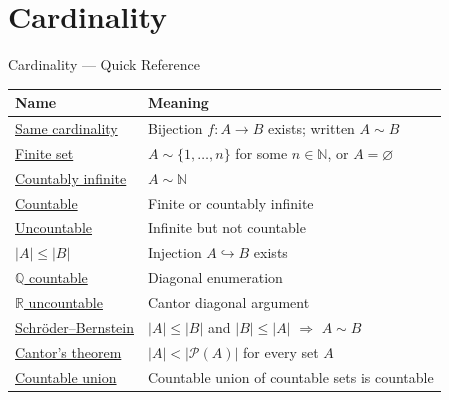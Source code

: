 \section{Cardinality}


\begin{toolkitbox}{Cardinality --- Quick Reference}
\small
\begin{tabular}{l l}
\toprule
\textbf{Name}  & \textbf{Meaning} \\
\midrule
\hyperref[def:same-cardinality]{Same cardinality}      & Bijection $f : A \to B$ exists; written $A \sim B$            \\
\hyperref[def:finite-infinite]{Finite set}            & $A \sim \{1,\dots,n\}$ for some $n \in \mathbb{N}$, or $A = \varnothing$ \\
\hyperref[def:countable]{Countably infinite}    & $A \sim \mathbb{N}$                                           \\
\hyperref[def:countable]{Countable}             & Finite or countably infinite                                  \\
\hyperref[def:countable]{Uncountable}           & Infinite but not countable                                    \\
\hyperref[def:cardinality-order]{$|A| \leq |B|$}        & Injection $A \hookrightarrow B$ exists                        \\
\hyperref[thm:Q-countable]{$\mathbb{Q}$ countable}  & Diagonal enumeration                                       \\
\hyperref[thm:R-uncountable]{$\mathbb{R}$ uncountable}  & Cantor diagonal argument                                \\
\hyperref[thm:schroder-bernstein]{Schr\"{o}der--Bernstein}   & $|A|\leq|B|$ and $|B|\leq|A|$ $\Rightarrow$ $A \sim B$      \\
\hyperref[thm:cantor]{Cantor's theorem}      & $|A| < |\mathcal{P}(A)|$ for every set $A$                   \\
\hyperref[thm:countable-union]{Countable union}       & Countable union of countable sets is countable                \\
\bottomrule
\end{tabular}
\end{toolkitbox}


